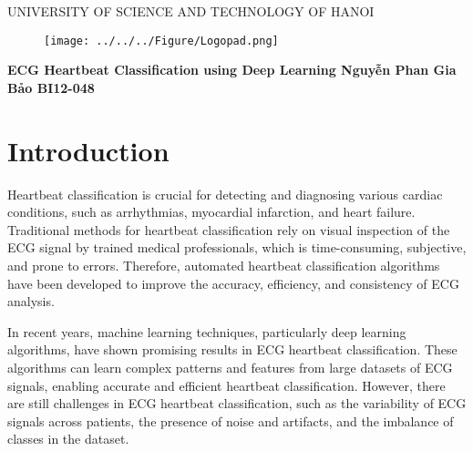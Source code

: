 \documentclass[14pt]{extreport}
\begin{document}
\begin{titlepage}
    \begin{center}
        \begin{adjustwidth}{-100pt}{-100pt}
            \centering
            {\fontsize{20}{15}\selectfont UNIVERSITY OF SCIENCE AND TECHNOLOGY OF HANOI}
            \vspace{1cm}
            \begin{figure}[ht]
                \texttt{[image: ../../../Figure/Logopad.png]}
            \end{figure}
            \vspace{2cm}

        \end{adjustwidth}
        \linespread{1}\LARGE \bfseries ECG Heartbeat Classification using Deep Learning
        \newline
        \vspace{4cm}
        \textbf{\Large Nguyễn Phan Gia Bảo}
        \newline
        \textbf{\Large BI12-048}
        \date{}
    \end{center}
\end{titlepage}


\begingroup\singlespacing
\tableofcontents
\endgroup
\clearpage


\chapter{Introduction}

Heartbeat classification is crucial for detecting and diagnosing various cardiac conditions, such as arrhythmias, myocardial infarction, and heart failure. Traditional methods for heartbeat classification rely on visual inspection of the ECG signal by trained medical professionals, which is time-consuming, subjective, and prone to errors. Therefore, automated heartbeat classification algorithms have been developed to improve the accuracy, efficiency, and consistency of ECG analysis.

In recent years, machine learning techniques, particularly deep learning algorithms, have shown promising results in ECG heartbeat classification. These algorithms can learn complex patterns and features from large datasets of ECG signals, enabling accurate and efficient heartbeat classification. However, there are still challenges in ECG heartbeat classification, such as the variability of ECG signals across patients, the presence of noise and artifacts, and the imbalance of classes in the dataset.
\end{document}
